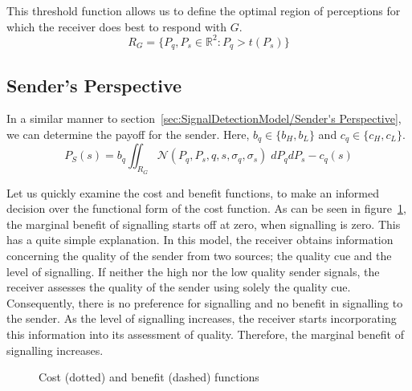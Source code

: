 \documentclass[a4paper,12pt]{article}
\numberwithin{equation}{section}
\begin{document}
This threshold function allows us to define the optimal region of perceptions for which the receiver does best to respond with $G$.
\begin{equation}
\label{eq:CueandSignalDetectionModel/RG}
R_{G} = \{P_{q}, P_{s} \in \mathbb{R}^{2} : P_{q}>t(P_{s})\}
\end{equation}


\subsection{Sender's Perspective}
\label{sec:CueandSignalDetectionModel/Sender's Perspective}

In a similar manner to section~\ref{sec:SignalDetectionModel/Sender's Perspective}, we can determine the payoff for the sender. Here, $b_{q} \in \{b_{H}, b_{L}\}$ and $c_{q} \in \{c_{H}, c_{L}\}$.
\begin{equation}
\label{eq:CueandSignalDetectionModel/PayoffS}
P_{S}(s) = b_{q} \displaystyle \iint_{R_{G}} \mathcal{N}(P_{q}, P_{s}, q, s, \sigma_{q}, \sigma_{s}) \; dP_{q}dP_{s}-c_{q}(s)
\end{equation}

Let us quickly examine the cost and benefit functions, to make an informed decision over the functional form of the cost function. As can be seen in figure~\ref{fig:Model 2/Figure 3132}, the marginal benefit of signalling starts off at zero, when signalling is zero. This has a quite simple explanation. In this model, the receiver obtains information concerning the quality of the sender from two sources; the quality cue and the level of signalling. If neither the high nor the low quality sender signals, the receiver assesses the quality of the sender using solely the quality cue. Consequently, there is no preference for signalling and no benefit in signalling to the sender. As the level of signalling increases, the receiver starts incorporating this information into its assessment of quality. Therefore, the marginal benefit of signalling increases.
\begin{figure}[h]
\begin{center}
\hspace{8mm}
\caption{Cost (dotted) and benefit (dashed) functions}
\label{fig:Model 2/Figure 3132}
\end{center}
\end{figure}
 
\end{document}
